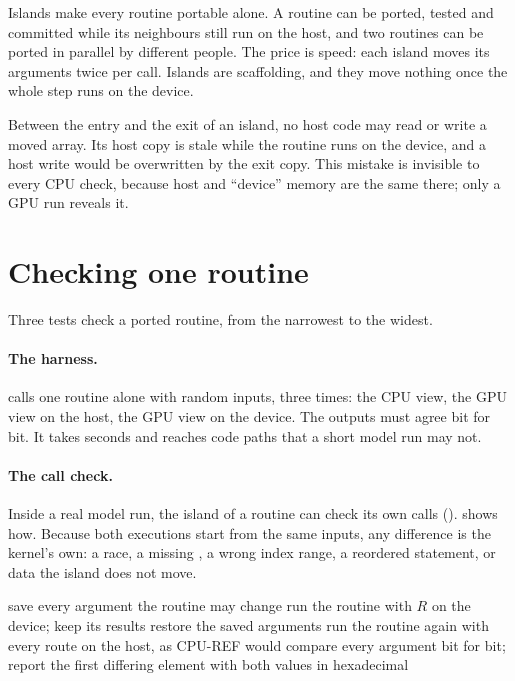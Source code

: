 Islands make every routine portable alone. A routine can be ported, tested and committed while its neighbours still
run on the host, and two routines can be ported in parallel by different people. The price is speed: each island
moves its arguments twice per call. Islands are scaffolding, and they move nothing once the whole step runs on the
device.

\begin{keypoint}
Between the entry and the exit of an island, no host code may read or write a moved array. Its host copy is stale
while the routine runs on the device, and a host write would be overwritten by the exit copy. This mistake is
invisible to every CPU check, because host and ``device'' memory are the same there; only a GPU run reveals it.
\end{keypoint}

\section{Checking one routine}

Three tests check a ported routine, from the narrowest to the widest.

\paragraph{The harness.}  calls one routine alone with random inputs, three times: the
CPU view, the GPU view on the host, the GPU view on the device. The outputs must agree bit for bit. It takes seconds
and reaches code paths that a short model run may not.

\paragraph{The call check.} Inside a real model run, the island of a routine can check its own calls
().  shows how. Because both executions start from the same
inputs, any difference is the kernel's own: a race, a missing , a wrong index range, a reordered
statement, or data the island does not move.

\begin{algorithm}[ht]
\caption{The call check of route $R$ (=$R$:$n$).}
\label{alg:callcheck}
\begin{algorithmic}[1]
\State save every argument the routine may change
\State run the routine with $R$ on the device; keep its results
\State restore the saved arguments
\State run the routine again with every route on the host, as CPU-REF would
\State compare every argument bit for bit; report the first differing element with both values in hexadecimal
\end{algorithmic}
\end{algorithm}

